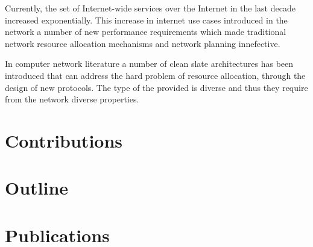 


Currently, the set of Internet-wide services over the Internet in the last
decade increased exponentially. This increase in internet use cases introduced
in the network a number of new performance requirements which made traditional
network resource allocation mechanisms and network planning innefective.

In computer network literature a number of clean slate architectures has been
introduced that can address the hard problem of resource allocation, through the
design of new protocols. 
The type of the provided is diverse and thus they require
from the network diverse properties. 


\section{Contributions}
\label{sec:intro:contributions}

\section{Outline}
\label{sec:intro:outline}

\section{Publications}
\label{sec:intro:pubs}

